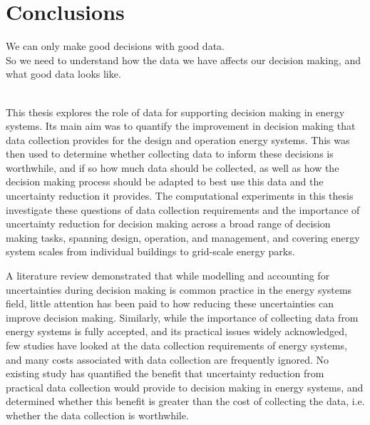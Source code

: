 
\chapter{Conclusions} \label{chap:conclusion}

\begin{cbox}[colback=black!5!white]{}
    \large
    We can only make good decisions with good data.\\
    So we need to understand how the data we have affects our decision making, and what good data looks like.
\end{cbox}

\hfill \\

\noindent
This thesis explores the role of data for supporting decision making in energy systems. Its main aim was to quantify the improvement in decision making that data collection provides for the design and operation energy systems. This was then used to determine whether collecting data to inform these decisions is worthwhile, and if so how much data should be collected, as well as how the decision making process should be adapted to best use this data and the uncertainty reduction it provides.
The computational experiments in this thesis investigate these questions of data collection requirements and the importance of uncertainty reduction for decision making across a broad range of decision making tasks, spanning design, operation, and management, and covering energy system scales from individual buildings to grid-scale energy parks.

\newpage
A literature review demonstrated that while modelling and accounting for uncertainties during decision making is common practice in the energy systems field, little attention has been paid to how reducing these uncertainties can improve decision making. Similarly, while the importance of collecting data from energy systems is fully accepted, and its practical issues widely acknowledged, few studies have looked at the data collection requirements of energy systems, and many costs associated with data collection are frequently ignored. No existing study has quantified the benefit that uncertainty reduction from practical data collection would provide to decision making in energy systems, and determined whether this benefit is greater than the cost of collecting the data, i.e. whether the data collection is worthwhile.


